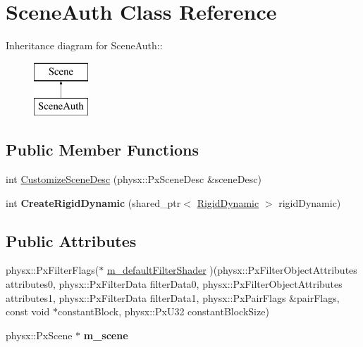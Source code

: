 \hypertarget{classSceneAuth}{
\section{SceneAuth Class Reference}
\label{classSceneAuth}
}
Inheritance diagram for SceneAuth::\begin{figure}[H]
\begin{center}
\leavevmode
\includegraphics[height=2cm]{classSceneAuth}
\end{center}
\end{figure}
\subsection*{Public Member Functions}
\begin{DoxyCompactItemize}
\item 
int \hyperlink{classSceneAuth_ac61436be3715d7086fd1bf2bf7aa91e3}{CustomizeSceneDesc} (physx::PxSceneDesc \&sceneDesc)
\item 
\hypertarget{classSceneAuth_a87f4072eb8d949659a57cca26a2feb69}{
int {\bfseries CreateRigidDynamic} (shared\_\-ptr$<$ \hyperlink{classRigidDynamic}{RigidDynamic} $>$ rigidDynamic)}
\label{classSceneAuth_a87f4072eb8d949659a57cca26a2feb69}

\end{DoxyCompactItemize}
\subsection*{Public Attributes}
\begin{DoxyCompactItemize}
\item 
physx::PxFilterFlags($\ast$ \hyperlink{classSceneAuth_af2cc65840cdc6b21a7648cb63cd65437}{m\_\-defaultFilterShader} )(physx::PxFilterObjectAttributes attributes0, physx::PxFilterData filterData0, physx::PxFilterObjectAttributes attributes1, physx::PxFilterData filterData1, physx::PxPairFlags \&pairFlags, const void $\ast$constantBlock, physx::PxU32 constantBlockSize)
\item 
\hypertarget{classSceneAuth_a4e3c9551b0b62b85c6922f26cc59a597}{
physx::PxScene $\ast$ {\bfseries m\_\-scene}}
\label{classSceneAuth_a4e3c9551b0b62b85c6922f26cc59a597}

\end{DoxyCompactItemize}


